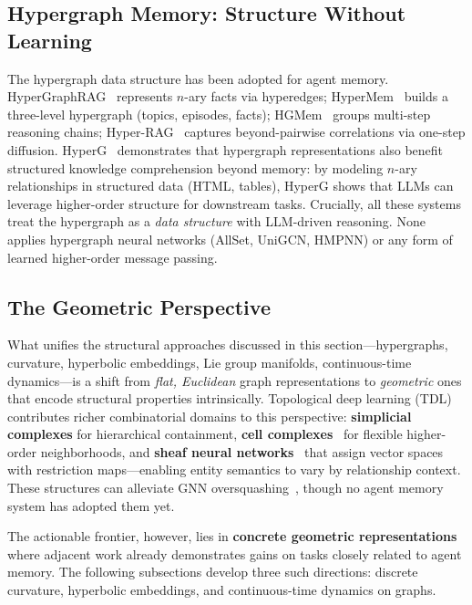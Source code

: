 \documentclass[hf]{ceurart}
\begin{document}
\subsection{Hypergraph Memory: Structure Without Learning}

The hypergraph data structure has been adopted for agent memory.
HyperGraphRAG~\cite{hypergraphrag2025} represents $n$-ary facts via
hyperedges; HyperMem~\cite{hypermem2026} builds a three-level
hypergraph (topics, episodes, facts);
HGMem~\cite{hgmem2025} groups multi-step reasoning chains;
Hyper-RAG~\cite{hyperrag2026} captures beyond-pairwise correlations
via one-step diffusion. HyperG~\cite{hyperg2025} demonstrates that
hypergraph representations also benefit structured knowledge
comprehension beyond memory: by modeling $n$-ary relationships in
structured data (HTML, tables), HyperG shows that LLMs can leverage
higher-order structure for downstream tasks. Crucially, all these
systems treat the hypergraph as a \emph{data structure} with
LLM-driven reasoning. None applies hypergraph neural networks
(AllSet, UniGCN, HMPNN) or any form of learned higher-order message
passing.

\subsection{The Geometric Perspective}

What unifies the structural approaches discussed in this
section---hypergraphs, curvature, hyperbolic embeddings, Lie group
manifolds, continuous-time dynamics---is a shift from \emph{flat,
Euclidean} graph representations to \emph{geometric} ones that encode
structural properties intrinsically. Topological deep learning
(TDL)~\cite{tdlposition2024,papillon2024} contributes richer
combinatorial domains to this perspective: \textbf{simplicial complexes}
for hierarchical containment, \textbf{cell
complexes}~\cite{cwn2021} for flexible higher-order neighborhoods,
and \textbf{sheaf neural networks}~\cite{sheafnn2024} that assign
vector spaces with restriction maps---enabling entity semantics to vary
by relationship context. These structures can alleviate GNN
oversquashing~\cite{demystifying2025}, though no agent memory system
has adopted them yet.

The actionable frontier, however, lies in \textbf{concrete geometric
representations} where adjacent work already demonstrates gains on tasks
closely related to agent memory. The following subsections develop three
such directions: discrete curvature, hyperbolic embeddings, and
continuous-time dynamics on graphs.
\end{document}
